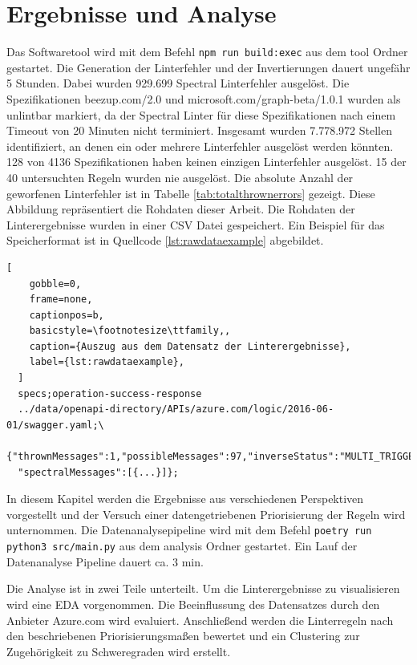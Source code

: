 \section{Ergebnisse und Analyse} \label{sec:ergebnisseundanalyse}
Das Softwaretool wird mit dem Befehl \texttt{npm run build:exec} aus dem tool Ordner gestartet. Die Generation der Linterfehler und der Invertierungen dauert ungefähr 5 Stunden. Dabei wurden 929.699 Spectral Linterfehler ausgelöst. Die Spezifikationen beezup.com/2.0 und microsoft.com/graph-beta/1.0.1 wurden als unlintbar markiert, da der Spectral Linter für diese Spezifikationen nach einem Timeout von 20 Minuten nicht terminiert. Insgesamt wurden 7.778.972 Stellen identifiziert, an denen ein oder mehrere Linterfehler ausgelöst werden könnten. 128 von 4136 Spezifikationen haben keinen einzigen Linterfehler ausgelöst. 15 der 40 untersuchten Regeln wurden nie ausgelöst. Die absolute Anzahl der geworfenen Linterfehler ist in Tabelle \ref{tab:totalthrownerrors} gezeigt. Diese Abbildung repräsentiert die Rohdaten dieser Arbeit. Die Rohdaten der Linterergebnisse wurden in einer \acs{CSV} Datei gespeichert. Ein Beispiel für das Speicherformat ist in Quellcode \ref{lst:rawdataexample} abgebildet.

\lstset{language=none}
  \begin{lstlisting}[
    gobble=0,
    frame=none,
    captionpos=b,
    basicstyle=\footnotesize\ttfamily,,
    caption={Auszug aus dem Datensatz der Linterergebnisse},
    label={lst:rawdataexample},
  ]
  specs;operation-success-response
  ../data/openapi-directory/APIs/azure.com/logic/2016-06-01/swagger.yaml;\
  {"thrownMessages":1,"possibleMessages":97,"inverseStatus":"MULTI_TRIGGER",\
  "spectralMessages":[{...}]};
  \end{lstlisting}

In diesem Kapitel werden die Ergebnisse aus verschiedenen Perspektiven vorgestellt und der Versuch einer datengetriebenen Priorisierung der Regeln wird unternommen. Die Datenanalysepipeline wird mit dem Befehl \texttt{poetry run python3 src/main.py} aus dem analysis Ordner gestartet. Ein Lauf der Datenanalyse Pipeline dauert ca. 3 min.

Die Analyse ist in zwei Teile unterteilt. Um die Linterergebnisse zu visualisieren wird eine \acl{EDA} vorgenommen. Die Beeinflussung des Datensatzes durch den Anbieter Azure.com wird evaluiert. Anschließend werden die Linterregeln nach den beschriebenen Priorisierungsmaßen bewertet und ein Clustering zur Zugehörigkeit zu Schweregraden wird erstellt. 


